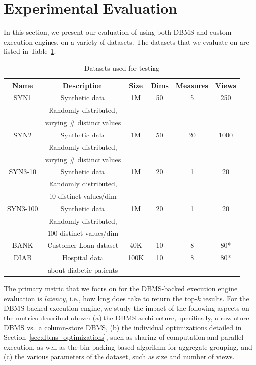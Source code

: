 
\section{Experimental Evaluation}
\label{sec:experiments}
 
In this section, we present our evaluation of
\VizRecDB using both DBMS and custom execution engines, 
on a variety of datasets.
The datasets that we evaluate \VizRecDB on are listed 
in Table~\ref{tab:datasets}.


\begin{table}[htb]
  \centering \scriptsize
  \begin{tabular}{|c|c|c|c|c|c|} \hline
  Name & Description & Size & Dims & Measures & Views \\ \hline
  SYN1 & Synthetic data & 1M & 50 & 5 & 250 \\
  & Randomly distributed, & & & & \\ 
  & varying \# distinct values & & & & \\ \hline
  SYN2 & Synthetic data & 1M & 50 & 20 & 1000 \\
  & Randomly distributed, & & & & \\ 
  & varying \# distinct values & & & & \\ \hline
  SYN3-10 & Synthetic data & 1M & 20 & 1 & 20 \\
  & Randomly distributed, & & & & \\ 
  & 10 distinct values/dim & & & & \\ \hline
  SYN3-100 & Synthetic data & 1M & 20 & 1 & 20 \\
  & Randomly distributed, & & & & \\ 
  & 100 distinct values/dim & & & & \\ \hline
  BANK  & Customer Loan dataset  & 40K & 10 & 8 & 80* \\ \hline
  DIAB  & Hospital data & 100K & 10 & 8 & 80* \\
  & about diabetic patients & & & & \\ \hline
  \end{tabular}
  \caption{Datasets used for testing}
  \label{tab:datasets} 
  \vspace{-10pt}
\end{table}



The primary metric that we focus on for the DBMS-backed execution engine
evaluation is {\em latency},
i.e., how long does \VizRecDB take to return the top-$k$ results.
For the DBMS-backed execution engine, we study the impact of the following
aspects on the metrics described above:
(a) the DBMS architecture, specifically, a row-store DBMS vs.~a column-store DBMS,
(b) the individual optimizations detailed in Section~\ref{sec:dbms_optimizations},
such as sharing of computation and parallel execution, as well as 
the bin-packing-based algorithm for aggregate grouping, and
(c) the various parameters of the dataset, such as size and number of views.


